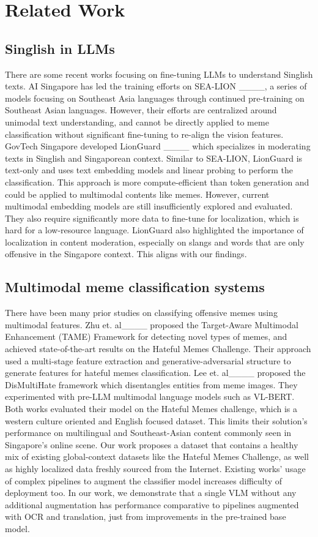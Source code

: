 \section{Related Work}
\subsection{Singlish in LLMs}
There are some recent works focusing on fine-tuning LLMs to understand Singlish texts. AI Singapore has led the training efforts on SEA-LION ____, a series of models focusing on Southeast Asia languages through continued pre-training on Southeast Asian languages. However, their efforts are centralized around unimodal text understanding, and cannot be directly applied to meme classification without significant fine-tuning to re-align the vision features. GovTech Singapore developed LionGuard ____ which specializes in moderating texts in Singlish and Singaporean context. Similar to SEA-LION, LionGuard is text-only and uses text embedding models and linear probing to perform the classification. This approach is more compute-efficient than token generation and could be applied to multimodal contents like memes. However, current multimodal embedding models are still insufficiently explored and evaluated. They also require significantly more data to fine-tune for localization, which is hard for a low-resource language. LionGuard also highlighted the importance of localization in content moderation, especially on slangs and words that are only offensive in the Singapore context. This aligns with our findings.

\subsection{Multimodal meme classification systems}
There have been many prior studies on classifying offensive memes using multimodal features. Zhu et. al____ proposed the Target-Aware Multimodal Enhancement (TAME) Framework for detecting novel types of memes, and achieved state-of-the-art results on the Hateful Memes Challenge. Their approach used a multi-stage feature extraction and generative-adversarial structure to generate features for hateful memes classification. Lee et. al____ proposed the DisMultiHate framework which disentangles entities from meme images. They experimented with pre-LLM multimodal language models such as VL-BERT. Both works evaluated their model on the Hateful Memes challenge, which is a western culture oriented and English focused dataset. This limits their solution's performance on multilingual and Southeast-Asian content commonly seen in Singapore's online scene. Our work proposes a dataset that contains a healthy mix of existing global-context datasets like the Hateful Memes Challenge, as well as highly localized data freshly sourced from the Internet. Existing works' usage of complex pipelines to augment the classifier model increases difficulty of deployment too. In our work, we demonstrate that a single VLM without any additional augmentation has performance comparative to pipelines augmented with OCR and translation, just from improvements in the pre-trained base model.

